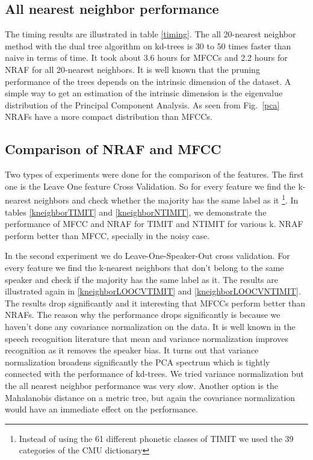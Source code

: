 \documentclass[12pt,letterpaper,doublespaced,ETD,dvips,proposal]{gtthesis}
\begin{document}
\begin{Body}
\subsection{All nearest neighbor performance}
The timing results are illustrated in table \ref{timing}. The all
20-nearest neighbor method with the dual tree algorithm on kd-trees
is 30 to 50 times faster than naive in terms of time. It took about
3.6 hours for MFCCs and 2.2 hours for NRAF for all 20-nearest
neighbors. It is well known that the pruning performance of the
trees depends on the intrinsic dimension of the dataset. A simple
way to get an estimation of the intrinsic dimension is the
eigenvalue distribution of the Principal Component Analysis. As seen
from Fig.~\ref{pca} NRAFs have a more compact distribution than
MFCCs.
\subsection{Comparison of NRAF and MFCC}
Two types of experiments were done for the comparison of the
features. The first one is the Leave One feature Cross Validation.
So for every feature we find the k-nearest neighbors and check
whether the majority has the same label as it \footnote{Instead of
using the 61 different phonetic classes of TIMIT we used the 39
categories of the CMU dictionary}. In tables \ref{kneighborTIMIT}
and \ref{kneighborNTIMIT}, we demonstrate the performance of MFCC
and NRAF for TIMIT and NTIMIT for various k. NRAF perform better
than MFCC, specially in the noisy case.

In the second experiment we do Leave-One-Speaker-Out cross
validation. For every feature we find the k-nearest neighbors that
don't belong to the same speaker and check if the majority has the
same label as it. The results are illustrated again in
\ref{kneighborLOOCVTIMIT} and \ref{kneighborLOOCVNTIMIT}. The
results drop significantly and it interesting that MFCCs perform
better than NRAFs. The reason why the performance drops
significantly is because we haven't done any covariance
normalization on the data. It is well known in the speech
recognition literature that mean and variance normalization improves
recognition as it removes the speaker bias. It turns out that
variance normalization broadens significantly the PCA spectrum which
is tightly connected with the performance of kd-trees. We tried
variance normalization but the all nearest neighbor performance was
very slow. Another option is the Mahalanobis distance on a metric
tree, but again the covariance normalization would have an immediate
effect on the performance.


\end{Body}
\end{document}
